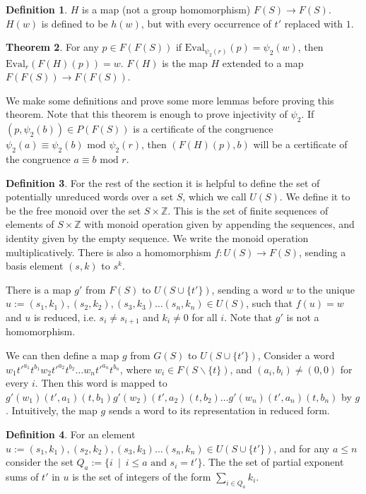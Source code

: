 \documentclass[12pt]{article} %
\theoremstyle{definition}
\newtheorem{theorem}{Theorem}[section]
\theoremstyle{definition}
\theoremstyle{definition}
\theoremstyle{definition}
\theoremstyle{definition}
\newtheorem{defn}[theorem]{Definition}
\theoremstyle{definition}
\begin{document}
\begin{defn} \label{PowProof}
  $H$ is a map (not a group homomorphism) $F(S) \to F(S)$. $H(w)$ is defined to be
  $h(w)$, but with every occurrence of $t'$ replaced with $1$.
\end{defn}

\begin{theorem}\label{powproof}
  For any $p \in F(F(S))$ if $\text{Eval}_{\psi_2(r)}(p) = \psi_2(w)$,
  then $\text{Eval}_r(F(H)(p)) = w$. $F(H)$ is the map $H$ extended to a map
  $F(F(S)) \to F(F(S))$.
\end{theorem}

We make some definitions and prove some more lemmas before proving this theorem.
Note that this theorem is enough to prove injectivity of $\psi_2$.
If $(p, \psi_2(b)) \in P(F(S))$ is a certificate of the congruence
$\psi_2(a) \equiv \psi_2(b) \text{ mod }\psi_2(r)$, then
$(F(H)(p), b)$ will be a certificate of the congruence $a \equiv b \text{ mod } r$.

\begin{defn}
  For the rest of the section it is helpful to define the set of potentially unreduced
  words over a set $S$, which we call $U(S)$.
  We define it to be the free monoid over the set $S \times \mathbb{Z}$.
  This is the set of finite sequences of elements of $S \times \mathbb{Z}$ with monoid operation
  given by appending the sequences, and identity given by the empty sequence. We write
  the monoid operation multiplicatively.
  There is also a homomorphism $f : U(S) \to F(S)$, sending a basis element $(s, k)$ to
  $s^k$.
\end{defn}

There is a map $g'$ from $F(S)$ to $U(S \cup \{t'\})$, sending a word $w$ to the unique
$u := (s_1, k_1), (s_2, k_2), (s_3, k_3) \dots (s_n, k_n) \in U(S)$, such that
$f(u) = w$ and $u$ is reduced, i.e. $s_i \ne s_{i+1}$ and $k_i \ne 0$ for all $i$.
Note that $g'$ is not a homomorphism.

We can then define a map $g$ from $G(S)$ to $U(S \cup \{t'\})$,
Consider a word $w_1t'^{a_1}t^{b_1}w_2t'^{a_2}t^{b_2} \dots w_nt'^{a_n}t^{b_n}$, where
$w_i \in F(S \backslash \{t\})$, and $(a_i, b_i) \ne (0, 0)$ for every $i$.
Then this word is mapped to $g'(w_1)(t', a_1)(t, b_1)g'(w_2)(t', a_2)(t, b_2) \dots
g'(w_n)(t', a_n)(t, b_n)$ by $g$. Intuitively, the map $g$ sends a word to its
representation in reduced form.

\begin{defn}
  For an element $u := (s_1, k_1), (s_2, k_2), (s_3, k_3) \dots (s_n, k_n) \in U(S \cup \{t'\})$,
  and for any $a \le n$
  consider the set $Q_a := \{ i \ \mid \ i \le a \text{ and } s_i = t' \}$.
  The the set of partial exponent sums of $t'$ in $u$ is the set of integers of the
  form $\sum_{i \in Q_a} k_i$.
\end{defn}
\end{document}
